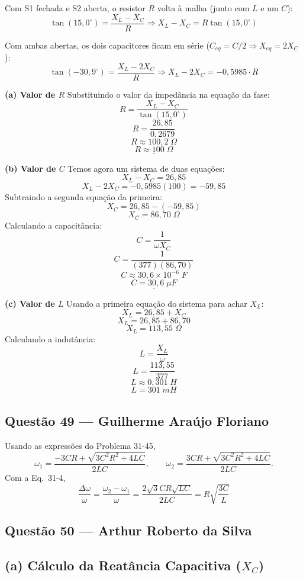 \documentclass[12pt,a4paper]{article}
\begin{document}
Com S1 fechada e S2 aberta, o resistor \(R\) volta à malha (junto com \(L\) e um \(C\)):
\[\tan(15,0^\circ) = \frac{X_L - X_C}{R} \Rightarrow X_L - X_C = R \tan(15,0^\circ)\]

Com ambas abertas, os dois capacitores ficam em série (\(C_{eq} = C/2 \Rightarrow X_{eq} = 2X_C\)):
\[\tan(-30,9^\circ) = \frac{X_L - 2X_C}{R} \Rightarrow X_L - 2X_C = -0,5985 \cdot R\]

\vspace{0.2cm}
\textbf{(a) Valor de \(R\)}
Substituindo o valor da impedância na equação da fase:
\[R = \frac{X_L - X_C}{\tan(15,0^\circ)}\]
\[R = \frac{26,85}{0,2679}\]
\[R \approx 100,2\;\Omega\]
\[\underline{R \approx 100\;\Omega}\]

\vspace{0.2cm}
\textbf{(b) Valor de \(C\)}
Temos agora um sistema de duas equações:
\[X_L - X_C = 26,85\]
\[X_L - 2X_C = -0,5985(100) = -59,85\]
Subtraindo a segunda equação da primeira:
\[X_C = 26,85 - (-59,85)\]
\[X_C = 86,70\;\Omega\]
Calculando a capacitância:
\[C = \frac{1}{\omega X_C}\]
\[C = \frac{1}{(377)(86,70)}\]
\[C \approx 30,6 \times 10^{-6}\;F\]
\[\underline{C = 30,6\;\mu F}\]

\vspace{0.2cm}
\textbf{(c) Valor de \(L\)}
Usando a primeira equação do sistema para achar \(X_L\):
\[X_L = 26,85 + X_C\]
\[X_L = 26,85 + 86,70\]
\[X_L = 113,55\;\Omega\]
Calculando a indutância:
\[L = \frac{X_L}{\omega}\]
\[L = \frac{113,55}{377}\]
\[L \approx 0,301\;H\]
\[\underline{L = 301\;mH}\]

\subsection{Questão 49 — Guilherme Araújo Floriano}

Usando as expressões do Problema 31-45,
\[
\omega_1 = \frac{-3CR + \sqrt{3C^2R^2+4LC}}{2LC},
\qquad
\omega_2 = \frac{3CR + \sqrt{3C^2R^2+4LC}}{2LC}.
\]
Com a Eq.~31-4,
\[
\frac{\Delta\omega}{\omega} = 
\frac{\omega_2-\omega_1}{\omega} =
\frac{2\sqrt{3}CR\sqrt{LC}}{2LC} =
R\sqrt{\frac{3C}{L}}
\]

\subsection{Questão 50 — Arthur Roberto da Silva}
\subsection*{(a) Cálculo da Reatância Capacitiva ($X_C$)}
\end{document}
